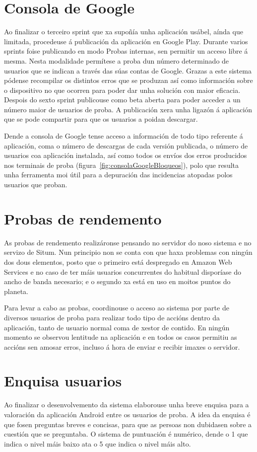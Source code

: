 \section{Consola de Google}
Ao finalizar o terceiro sprint que xa supoñía unha aplicación usábel, aínda que limitada, procedeuse á publicación da aplicación en Google Play. Durante varios sprints foise publicando en modo Probas internas, sen permitir un acceso libre á mesma. Nesta modalidade permítese a proba dun número determinado de usuarios que se indican a través das súas contas de Google. Grazas a este sistema pódense recompilar os distintos erros que se produzan así como información sobre o dispositivo no que ocorren para poder dar unha solución con maior eficacia.
Despois do sexto sprint publicouse como beta aberta para poder acceder a un número maior de usuarios de proba. A publicación xera unha ligazón á aplicación que se pode compartir para que os usuarios a poidan descargar.

Dende a consola de Google tense acceso a información de todo tipo referente á aplicación, coma o número de descargas de cada versión publicada, o número de usuarios coa aplicación instalada, así como todos os envíos dos erros producidos nos terminais de proba (figura~\ref{fig:consolaGoogleBloqueos}), polo que resulta unha ferramenta moi útil para a depuración das incidencias atopadas polos usuarios que proban.


\section{Probas de rendemento}
As probas de rendemento realizáronse pensando no servidor do noso sistema e no servizo de Situm. Nun principio non se conta con que haxa problemas con ningún dos dous elementos, posto que o primeiro está despregado en Amazon Web Services e no caso de ter máis usuarios concurrentes do habitual disporíase do ancho de banda necesario; e o segundo xa está en uso en moitos puntos do planeta.

Para levar a cabo as probas, coordinouse o acceso ao sistema por parte de diversos usuarios de proba para realizar todo tipo de accións dentro da aplicación, tanto de usuario normal coma de xestor de contido. En ningún momento se observou lentitude na aplicación e en todos os casos permitiu as accións sen amosar erros, incluso á hora de enviar e recibir imaxes o servidor.


\section{Enquisa usuarios}
Ao finalizar o desenvolvemento da sistema elaborouse unha breve enquisa para a valoración da aplicación Android entre os usuarios de proba. A idea da enquisa é que fosen preguntas breves e concisas, para que as persoas non dubidasen sobre a cuestión que se preguntaba. O sistema de puntuación é numérico, dende o 1 que indica o nivel máis baixo ata o 5 que indica o nivel máis alto.


